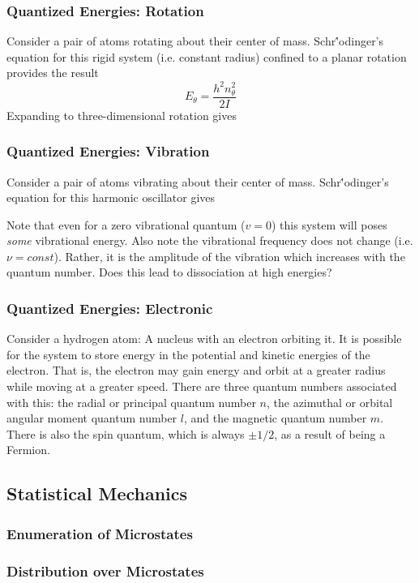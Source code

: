 \documentclass[11pt]{article}
\newcommand{\CenteredBoxed}[1]{\begin{center}\boxed{#1}\end{center}}
\begin{document}
\subsubsection{Quantized Energies: Rotation}
Consider a pair of atoms rotating about their center of mass. Schr{\''o}dinger's equation for this rigid system (i.e. constant radius) confined to a planar rotation provides the result
$$E_{\theta} = \frac{h^2n_{\theta}^2}{2I}$$
Expanding to three-dimensional rotation gives
\CenteredBoxed{E_{rot} = J(J+1)\frac{\hbar}{2I}}

\subsubsection{Quantized Energies: Vibration}
Consider a pair of atoms vibrating about their center of mass. Schr{\''o}dinger's equation for this harmonic oscillator gives
\CenteredBoxed{E_{vib} = h\nu\left(v+\frac{1}{2}\right)}

Note that even for a zero vibrational quantum ($v=0$) this system will poses \emph{some} vibrational energy. Also note the vibrational frequency does not change (i.e. $\nu = const$). Rather, it is the amplitude of the vibration which increases with the quantum number. Does this lead to dissociation at high energies?

\subsubsection{Quantized Energies: Electronic}
Consider a hydrogen atom: A nucleus with an electron orbiting it. It is possible for the system to store energy in the potential and kinetic energies of the electron. That is, the electron may gain energy and orbit at a greater radius while moving at a greater speed. There are three quantum numbers associated with this: the radial or principal quantum number $n$, the azimuthal or orbital angular moment quantum number $l$, and the magnetic quantum number $m$. There is also the spin quantum, which is always $\pm1/2$, as a result of being a Fermion.

\subsection{Statistical Mechanics}
\subsubsection{Enumeration of Microstates}
\subsubsection{Distribution over Microstates}
\end{document}
